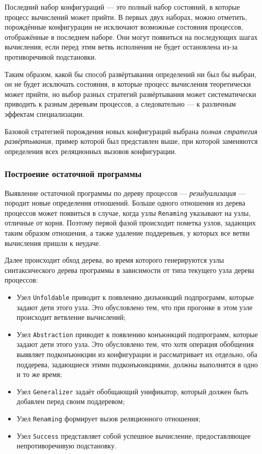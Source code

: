 Последний набор конфигураций --- это полный набор состояний, в которые процесс вычислений может
прийти. В первых двух наборах, можно отметить, порождённые конфигурации не исключают
возможные состояния процессов, отображённые в последнем наборе. Они могут появиться на последующих шагах вычисления,
если перед этим ветвь исполнения не будет остановлена из-за противоречивой подстановки.

Таким образом, какой бы способ развёртывания определений ни был бы выбран, он не будет
исключать состояния, в которые процесс вычисления теоретически может прийти, но выбор
разных стратегий развёртывания может систематически приводить к разным деревьям процессов,
а следовательно --- к различным эффектам специализации.

Базовой стратегией порождения новых конфигураций выбрана \emph{полная стратегия развёртывания},
пример которой был представлен выше, при которой заменяются определения всех реляционных вызовов
конфигурации.


\subsubsection{Построение остаточной программы}

Выявление остаточной программы по дереву процессов --- \emph{резидуализация} ---
породит новые определения отношений. Больше одного отношения из дерева процессов может
появиться в случае, когда узлы \lstinline{Renaming} указывают на узлы, отличные от корня.
Поэтому первой фазой происходит пометка узлов, задающих таким образом отношения,
а также удаление поддеревьев, у которых все ветви вычисления пришли к неудаче.

Далее происходит обход дерева, во время которого генерируются узлы синтаксического дерева программы
в зависимости от типа текущего узла дерева процессов:
\begin{itemize}
\item Узел \lstinline{Unfoldable} приводит к появлению дизъюнкций подпрограмм, которые задают дети этого узла.
      Это обусловлено тем, что при прогонке в этом узле происходит ветвление вычислений;
\item Узел \lstinline{Abstraction}  приводит к появлению конъюнкций подпрограмм, которые задают дети этого узла.
	  Это обусловлено тем, что хотя операция обобщения выявляет подконъюнкции из конфигурации и рассматривает их отдельно,
	  оба поддерева, задающиеся этими подконъюнкциями, должны выполнятся в одно и то же время;
\item Узел \lstinline{Generalizer} задаёт обобщающий унификатор, который должен быть добавлен
      перед своим поддеревом;
\item Узел \lstinline{Renaming} формирует вызов реляционного отношения;
\item Узел \lstinline{Success} представляет собой успешное вычисление, предоставляющее непротиворечивую подстановку.
\end{itemize}


